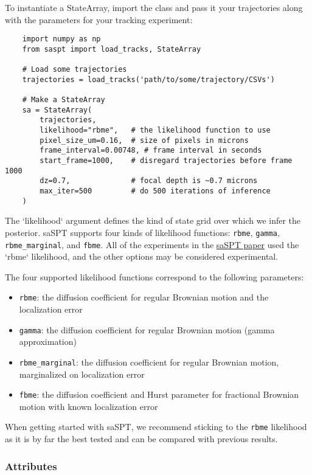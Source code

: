 \documentclass{article}
\begin{document}
To instantiate a StateArray, import the class and pass it your trajectories
along with the parameters for your tracking experiment:
\begin{verbatim}
    import numpy as np
    from saspt import load_tracks, StateArray

    # Load some trajectories
    trajectories = load_tracks('path/to/some/trajectory/CSVs')

    # Make a StateArray
    sa = StateArray(
        trajectories,
        likelihood="rbme",   # the likelihood function to use
        pixel_size_um=0.16,  # size of pixels in microns
        frame_interval=0.00748, # frame interval in seconds
        start_frame=1000,    # disregard trajectories before frame 1000
        dz=0.7,              # focal depth is ~0.7 microns
        max_iter=500         # do 500 iterations of inference
    )
\end{verbatim}
The `likelihood` argument defines the kind of state grid over which
we infer the posterior. saSPT supports four kinds of likelihood functions:
\verb|rbme|, \verb|gamma|, \verb|rbme_marginal|, and \verb|fbme|. All of
the experiments in the
\href{https://doi.org/10.1101/2021.05.03.442482}{saSPT paper} used
the `rbme` likelihood, and the other options may be considered experimental.

The four supported likelihood functions correspond to the following parameters:
\begin{itemize}
    \item \verb|rbme|: the diffusion coefficient for regular Brownian motion and the localization error
    \item \verb|gamma|: the diffusion coefficient for regular Brownian motion (gamma approximation)
    \item \verb|rbme_marginal|: the diffusion coefficient for regular Brownian motion, marginalized on localization error
    \item \verb|fbme|: the diffusion coefficient and Hurst parameter for fractional Brownian motion with known localization error
\end{itemize}

When getting started with saSPT, we recommend sticking to the \verb|rbme|
likelihood as it is by far the best tested and can be compared with previous
results.

\subsubsection{Attributes}
\end{document}
